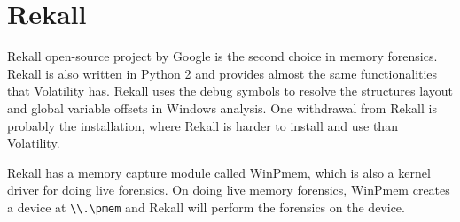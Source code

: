\section[Rekall]{Rekall}

Rekall open-source project by Google \cite{rekall} is the second choice in
memory forensics.  Rekall is also written in Python 2 and provides almost the
same functionalities that Volatility has. Rekall uses the debug symbols to
resolve the structures layout and global variable offsets in Windows analysis.
One withdrawal from Rekall is probably the installation, where Rekall is harder
to install and use than Volatility.

Rekall has a memory capture module called WinPmem, which is also a kernel
driver for doing live forensics. On doing live memory forensics, WinPmem
creates a device at \texttt{\textbackslash\textbackslash .\textbackslash pmem}
and Rekall will perform the forensics on the device.
